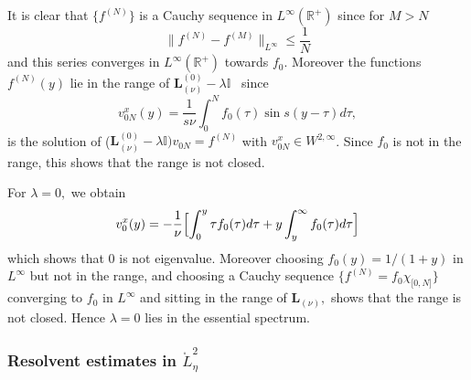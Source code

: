 \documentclass[11pt]{article}
\begin{document}
It is clear that $\{f^{(N)}\}$ is a Cauchy sequence in $L^{\infty }(\mathbb{R%
}^{+})$ since for $M>N$%
\begin{equation*}
\|f^{(N)}-f^{(M)}\|_{L^{\infty }}\leq \frac{1}{N}
\end{equation*}%
and this series converges in $L^{\infty }(\mathbb{R}^{+})$ towards $f_{0}.$
Moreover the functions $f^{(N)}(y)$ lie in the range of $\boldsymbol{L}%
_{(\nu )}^{(0)}-\lambda \mathbb{I}$ \ since%
 \begin{equation*}
v_{0N}^{x}(y)=\frac{1}{s\nu }\int_{0}^{N}f_{0}(\tau )\sin s(y-\tau
)d\tau,
\end{equation*}%
is the solution of ($\boldsymbol{L}_{(\nu )}^{(0)}-\lambda \mathbb{I)}%
v_{0N}=f^{(N)}$ with $v_{0N}^{x}\in W^{2,\infty }$. Since $f_{0}$ is not in
the range, this shows that the range is not closed.

For $\lambda =0,$ we obtain%
\begin{equation*}
v_{0}^{x}(y)=-\frac{1}{\nu }\Bigl[\int_{0}^{y}\tau f_{0}(\tau )d\tau
+y\int_{y}^{\infty }f_{0}(\tau )d\tau \Bigr]
\end{equation*}%
which shows that $0$ is not eigenvalue. Moreover choosing $f_{0}(y)=1/(1+y)$
in $L^{\infty }$ but not in the range, and choosing a Cauchy sequence $%
\{f^{(N)}=f_{0}\chi _{\lbrack 0,N]}\}$ converging to $f_{0}$ in $L^{\infty }$
and sitting in the range of $\boldsymbol{L}_{(\nu )},$ shows that the range
is not closed. Hence $\lambda =0$ lies in the essential spectrum.




\subsubsection{Resolvent estimates in $\mathring{L}_{\eta}^{2}$}\label{app 8.2.2}

\end{document}
